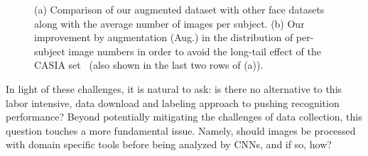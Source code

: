 \documentclass[runningheads]{llncs}
\begin{document}
\begin{figure}[t]
\centering
{}
\caption{
(a) Comparison of our augmented dataset with other face datasets along with the average number of images per subject. (b) Our improvement by augmentation (Aug.) in the distribution of per-subject image numbers in order to avoid the long-tail effect of the CASIA set~\cite{yi2014learning} (also shown in the last two rows of (a)). 
}
\label{fig:intro}

\end{figure}


In light of these challenges, it is natural to ask: is there no alternative to this labor intensive, data download and labeling approach to pushing recognition performance? Beyond potentially mitigating the challenges of data collection, this question touches a more fundamental issue. Namely, should images be processed with domain specific tools before being analyzed by CNNs, and if so, how?
\end{document}
